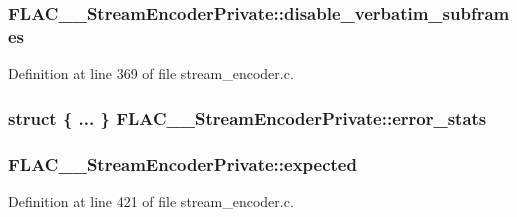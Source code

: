 \subsubsection[{\texorpdfstring{disable\+\_\+verbatim\+\_\+subframes}{disable_verbatim_subframes}}]{ F\+L\+A\+C\+\_\+\+\_\+\+Stream\+Encoder\+Private\+::disable\+\_\+verbatim\+\_\+subframes}\hypertarget{struct_f_l_a_c_____stream_encoder_private_a36e438b7b34b703b92ff511c2a70f6ce}{}\label{struct_f_l_a_c_____stream_encoder_private_a36e438b7b34b703b92ff511c2a70f6ce}


Definition at line 369 of file stream\+\_\+encoder.\+c.

\subsubsection[{\texorpdfstring{error\+\_\+stats}{error_stats}}]{\setlength{\rightskip}{0pt plus 5cm}struct \{ ... \}   F\+L\+A\+C\+\_\+\+\_\+\+Stream\+Encoder\+Private\+::error\+\_\+stats}\hypertarget{struct_f_l_a_c_____stream_encoder_private_a17dc3f0c51898d4639e7e3dcfb98cd91}{}\label{struct_f_l_a_c_____stream_encoder_private_a17dc3f0c51898d4639e7e3dcfb98cd91}
\subsubsection[{\texorpdfstring{expected}{expected}}]{ F\+L\+A\+C\+\_\+\+\_\+\+Stream\+Encoder\+Private\+::expected}\hypertarget{struct_f_l_a_c_____stream_encoder_private_a8dced4ffeff2e4501fd754c867c4b723}{}\label{struct_f_l_a_c_____stream_encoder_private_a8dced4ffeff2e4501fd754c867c4b723}


Definition at line 421 of file stream\+\_\+encoder.\+c.

